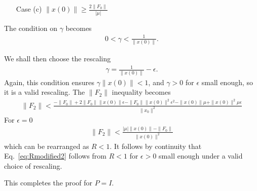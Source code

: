 \documentclass[superscriptaddress,onecolumn,nofootinbib,longbibliography,a4paper,accepted=2026-09-29]{quantumarticle}
\theoremstyle{plain}
\theoremstyle{definition}
\numberwithin{thm}{section}
\numberwithin{assumption}{section}
\numberwithin{lemma}{section}
\numberwithin{prop}{section}
\numberwithin{cor}{section}
\numberwithin{definition}{section}
\numberwithin{rmk}{section}
\numberwithin{equation}{section}
\begin{document}
\begin{itemize}
    \item[Case (c)] $\| x(0)\| \geq \frac{2 \| F_0\|}{|\mu|}$
\end{itemize}
The condition on $\gamma$ becomes
\begin{align}
    0 < \gamma < \frac{1 }{\| x(0)\|}.
\end{align}

We shall then choose the rescaling
\begin{align}
    \gamma = \frac{1}{ \| x(0)\|}-\epsilon.
\end{align}
Again, this condition ensures $\gamma \| x(0)\| < 1$, and $\gamma>0$ for $\epsilon$ small enough, so it is a valid rescaling. 
The $\|F_2\|$ inequality becomes
\begin{align}
\label{eq:Rmodified2}
    \| F_2\| < \frac{- \| F_0\| + 2 \| F_0\| \| x(0)\| \epsilon - \| F_0\| \| x(0)\|^2 \epsilon^2 - \| x(0)\| \mu + \| x(0)\|^2 \mu \epsilon}{\|x_0\|^2}
\end{align}
For $\epsilon = 0$
\begin{align}
   \|F_2\| < \frac{|\mu| \| x(0)\| - \| F_0\|}{\| x(0)\|^2}
\end{align}
which can be rearranged as $R<1$. It follows by continuity that Eq.~\eqref{eq:Rmodified2} follows from $R<1$ for $\epsilon>0$ small enough under a valid choice of rescaling.

This completes the proof for $P=I$.
\end{document}

